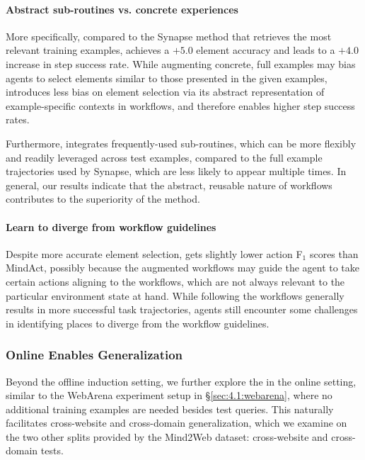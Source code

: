 \paragraph{Abstract sub-routines vs. concrete experiences}
More specifically, compared to the Synapse \citep{zheng2024synapse} method that retrieves the most relevant training examples, \awm achieves a $+5.0$ element accuracy and leads to a $+4.0$ increase in step success rate.
While augmenting concrete, full examples may bias agents to select elements similar to those presented in the given examples, \awm introduces less bias on element selection via its abstract representation of example-specific contexts in workflows, and therefore enables higher step success rates.

Furthermore, \awm integrates frequently-used sub-routines, which can be more flexibly and readily leveraged across test examples, compared to the full example trajectories used by Synapse, which are less likely to appear multiple times.
In general, our results indicate that the abstract, reusable nature of workflows contributes to the superiority of the \awm method.

\paragraph{Learn to diverge from workflow guidelines}
Despite more accurate element selection, \awm gets slightly lower action F$_1$ scores than MindAct, possibly because the augmented workflows may guide the agent to take certain actions aligning to the workflows, which are not always relevant to the particular environment state at hand. While following the workflows generally results in more successful task trajectories, agents still encounter some challenges in identifying places to diverge from the workflow guidelines.


\subsubsection{Online \awm Enables Generalization}

Beyond the offline induction setting, we further explore the \awm in the online setting, similar to the WebArena experiment setup in \S\ref{sec:4.1:webarena}, where no additional training examples are needed besides test queries. This naturally facilitates cross-website and cross-domain generalization, which we examine on the two other splits provided by the Mind2Web dataset: cross-website and cross-domain tests. 

